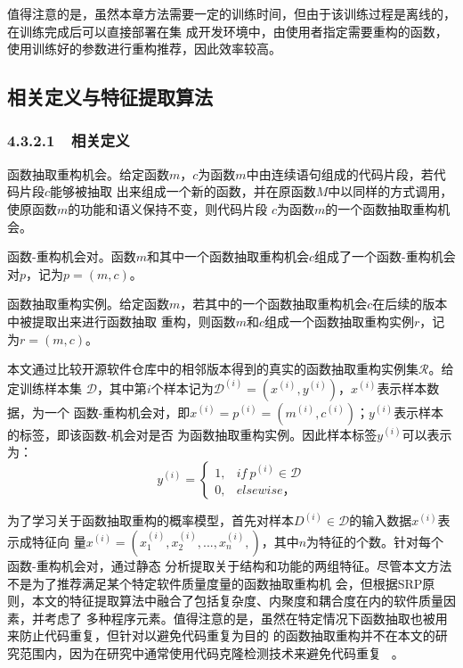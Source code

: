 值得注意的是，虽然本章方法需要一定的训练时间，但由于该训练过程是离线的，在训练完成后可以直接部署在集
成开发环境中，由使用者指定需要重构的函数，使用训练好的参数进行重构推荐，因此效率较高。

\subsection{相关定义与特征提取算法}
\subsubsection{4.3.2.1~~相关定义}

\begin{Definition}
  函数抽取重构机会。给定函数$m$，$c$为函数$m$中由连续语句组成的代码片段，若代码片段$c$能够被抽取
  出来组成一个新的函数，并在原函数$M$中以同样的方式调用，使原函数$m$的功能和语义保持不变，则代码片段
  $c$为函数$m$的一个函数抽取重构机会。
\end{Definition}

\begin{Definition}
  函数-重构机会对。函数$m$和其中一个函数抽取重构机会$c$组成了一个函数-重构机会对$p$，记为$p=(m,c)$。
\end{Definition}

\begin{Definition}
  函数抽取重构实例。给定函数$m$，若其中的一个函数抽取重构机会$c$在后续的版本中被提取出来进行函数抽取
  重构，则函数$m$和$c$组成一个函数抽取重构实例$r$，记为$r=(m,c)$。
\end{Definition}

本文通过比较开源软件仓库中的相邻版本得到的真实的函数抽取重构实例集$\mathcal R$。给定训练样本集
$\mathcal D$，其中第$i$个样本记为$\mathcal D^{(i)}=(x^{(i)},y^{(i)})$，$x^{(i)}$表示样本数据，为一个
函数-重构机会对，即$x^{(i)}=p^{(i)}=(m^{(i)},c^{(i)})$；$y^{(i)}$表示样本的标签，即该函数-机会对是否
为函数抽取重构实例。因此样本标签$y^{(i)}$可以表示为：
\begin{equation}
   y^{(i)} = 
       \begin{cases}
             1, & \textit{if}~p^{(i)}\in \mathcal D\\ 
  0, & elsewise，  
       \end{cases}
\end{equation}

为了学习关于函数抽取重构的概率模型，首先对样本$D^{(i)}\in\mathcal D$的输入数据$x^{(i)}$表示成特征向
量$x^{(i)}=(x^{(i)}_1,x^{(i)}_2,...,x^{(i)}_n,)$，其中$n$为特征的个数。针对每个函数-重构机会对，通过静态
分析提取关于结构和功能的两组特征。尽管本文方法不是为了推荐满足某个特定软件质量度量的函数抽取重构机
会，但根据SRP原则，本文的特征提取算法中融合了包括复杂度、内聚度和耦合度在内的软件质量因素，并考虑了
多种程序元素。值得注意的是，虽然在特定情况下函数抽取也被用来防止代码重复，但针对以避免代码重复为目的
的函数抽取重构并不在本文的研究范围内，因为在研究中通常使用代码克隆检测技术来避免代码重复
~\cite{bellon2007comparison}。

